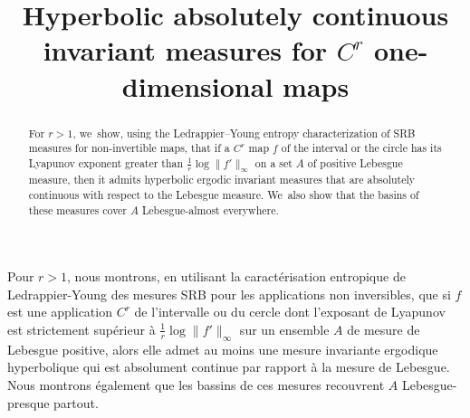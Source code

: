 \documentclass[JEP,XML,SOM,Unicode,NoFloatCountersInSection,published]{cedram}
\theoremstyle{definition}
\begin{document}
\frontmatter
\title[Hyperbolic absolutely continuous invariant measures for $C^r$ one-dimensional maps]{Hyperbolic absolutely continuous invariant measures for $C^r$ one-dimensional maps}

\author[\initial{A.} \lastname{Delplanque}]{ }
\address{Sorbonne Université and Université Paris Cité, CNRS, Laboratoire de Probabilités, Statistique et Modélisation,\\
F-75005 Paris, France}
\urladdr{}

\begin{abstract}
For $r > 1$, we~show, using the Ledrappier--Young entropy characterization of SRB measures for non-invertible maps, that if a $C^r$ map $f$ of the interval or the circle has its Lyapunov exponent greater than $\frac{1}{r} \log \| f' \|_{\infty}$ on a set $A$ of positive Lebesgue measure, then it admits hyperbolic ergodic invariant measures that are absolutely continuous with respect to the Lebesgue measure. We~also show that the basins of these measures cover $A$ Lebesgue-almost everywhere.
\end{abstract}





\begin{altabstract}
Pour $r > 1$, nous montrons, en utilisant la caractérisation entropique de Ledrappier-Young des mesures SRB pour les applications non inversibles, que si $f$ est une application $C^r$ de l'intervalle ou du cercle dont l'exposant de Lyapunov est strictement supérieur à $\frac{1}{r} \log \| f' \|_{\infty}$ sur un ensemble $A$ de mesure de Lebesgue positive, alors elle admet au moins une mesure invariante ergodique hyperbolique qui est absolument continue par rapport à la mesure de Lebesgue. Nous montrons également que les bassins de ces mesures recouvrent $A$ Lebesgue-presque partout.
\end{altabstract}

\maketitle
\vspace*{-\baselineskip}
\tableofcontents
\mainmatter
\end{document}
